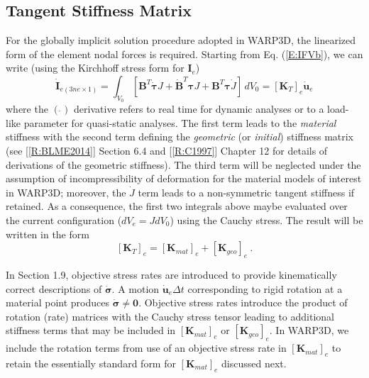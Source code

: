 \documentclass[11pt]{report}
\numberwithin{equation}{section}
\newcommand{\bmf } {\boldsymbol }  %
\newcommand{\ti}{\emph}
\newcommand{\nid}{\noindent}
\begin{document}
\subsection{Tangent Stiffness Matrix}
\nid For the globally implicit solution procedure adopted in WARP3D, the
linearized form of the element nodal forces is required. Starting from Eq. (\ref{E:IFVb}), we can 
write (using the Kirchhoff stress form for $\bmf{I}_e$)
%
\begin{equation}\label{E:TSa}
 \dot{ \bmf{I}}_{e(3ne\times1)} = 
 \int_{V_0} \left [ \mathbf{B}^T \dot{\bmf{\tau}} J+\dot{\mathbf{B}}^T \bmf{\tau}J +
  \mathbf{B}^T \bmf{\tau}\dot J \right ]\, dV_0 =
 \left [ \mathbf{K}_T \right ]_e \dot{\bmf{u}}_e
\end{equation}
%
\nid 
where the $(\dot\,)$ derivative refers to real time for dynamic analyses or to a load-like
parameter for quasi-static analyses. The first term leads to the \ti{material} stiffness with the second term
defining the \ti{geometric} (or \ti{initial}) stiffness matrix (see [\ref{R:BLME2014}] Section 6.4 
and [\ref{R:C1997}] Chapter 12 for details of 
derivations of the geometric stiffness). The third term will be neglected under the assumption of
incompressibility of deformation for the material models of interest in
WARP3D; moreover, the $\dot J$ term leads to a non-symmetric tangent stiffness if retained.
 As a consequence, the  first two integrals above maybe evaluated over the 
current configuration ($dV_e=J dV_0$) using the Cauchy stress. The result  will be written in the form
%
\begin{equation}\label{E:TSb}
 \left [ \mathbf{K}_T \right ]_e =  \left [ \mathbf{K}_{mat} \right ]_e +  \left [ \mathbf{K}_{geo} \right ]_e\ .
\end{equation}
%

In Section 1.9, objective stress rates are introduced to provide kinematically correct descriptions of
$\dot{\bmf{\sigma}}$. A motion $\dot{\bmf{u}}_e\Delta t$ corresponding to rigid
rotation at a material point produces $\dot{\bmf{\sigma}}\ne \mathbf{0}$. Objective stress
rates introduce the product of rotation (rate) matrices with the Cauchy stress tensor leading to additional
stiffness terms that may be included in  $ \left [ \mathbf{K}_{mat} \right ]_e$
or $ \left [ \mathbf{K}_{geo} \right ]_e$. In WARP3D, we include the rotation terms from use of
an objective stress rate in $ \left [ \mathbf{K}_{mat} \right ]_e$ to retain the essentially standard form
for $ \left [ \mathbf{K}_{mat} \right ]_e$ discussed next.
\end{document}
